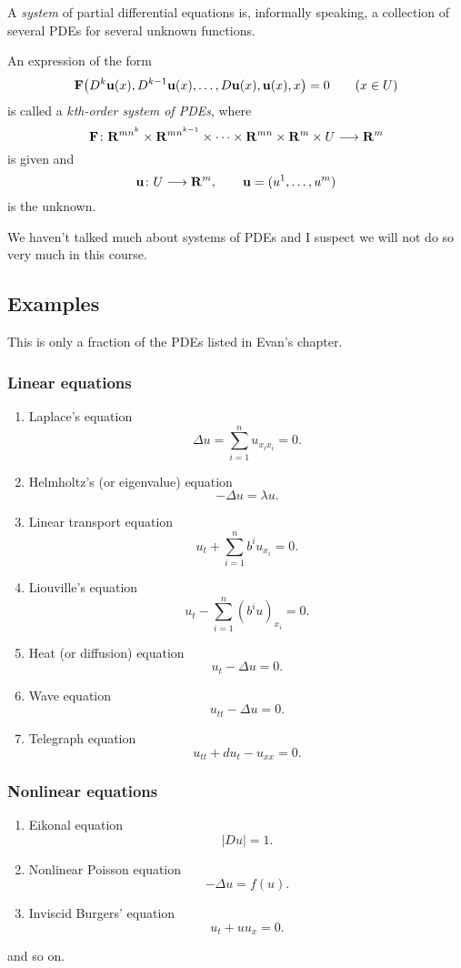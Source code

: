 A \emph{system} of partial differential equations is, informally speaking,
a collection of several PDEs for several unknown functions.

\begin{definition}
  An expression of the form
  \begin{equation}
    \label{eq:pde:k-order-system}
    \mathbf{F}\bigl(D^k\mathbf{u}(x),D^{k-1}\mathbf{u}(x),\dotsc,D\mathbf{u}(x),\mathbf{u}(x),x\bigr)=0\qquad
    (x\in U)
  \end{equation}
  is called a \emph{\(k\)th-order system of PDEs}, where
  \[
    \mathbf{F}\colon\mathbf{R}^{mn^k}\times\mathbf{R}^{mn^{k-1}}\times\dotsb\times\mathbf{R}^{mn}\times\mathbf{R}^m\times
    U\longrightarrow\mathbf{R}^m
  \]
  is given and
  \[
    \mathbf{u}\colon U\longrightarrow\mathbf{R}^m,\qquad\mathbf{u}=(u^1,\dotsc,u^m)
  \]
  is the unknown.
\end{definition}
\begin{remark}
  We haven't talked much about systems of PDEs and I suspect we will not do
  so very much in this course.
\end{remark}
\subsection{Examples}
This is only a fraction of the PDEs listed in Evan's chapter.

\subsubsection{Linear equations}
\begin{enumerate}[label=\arabic*.,noitemsep]
\item Laplace's equation
  \[
    \Delta u=\sum_{i=1}^n u_{x_ix_i}=0.
  \]
\item Helmholtz's (or eigenvalue) equation
  \[
    -\Delta u=\lambda u.
  \]
\item Linear transport equation
  \[
    u_t+\sum_{i=1}^n b^iu_{x_i}=0.
  \]
\item Liouville's equation
  \[
    u_t-\sum_{i=1}^n(b^iu)_{x_i}=0.
  \]
\item Heat (or diffusion) equation
  \[
    u_t-\Delta u=0.
  \]
\item Wave equation
  \[
    u_{tt}-\Delta u=0.
  \]
\item Telegraph equation
  \[
    u_{tt}+du_t-u_{xx}=0.
  \]
\end{enumerate}
\subsubsection{Nonlinear equations}
\begin{enumerate}[label=\arabic*.,noitemsep]
\item Eikonal equation
  \[
    |Du|=1.
  \]
\item Nonlinear Poisson equation
  \[
    -\Delta u=f(u).
  \]
\item Inviscid Burgers' equation
  \[
    u_t+uu_x=0.
  \]
\end{enumerate}
and so on.

